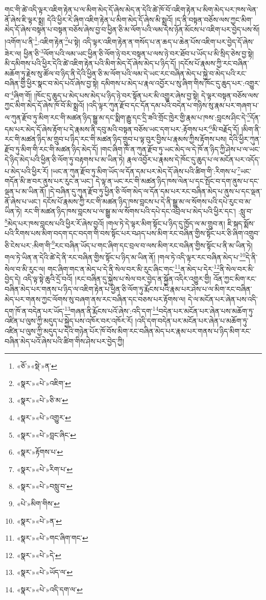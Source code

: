 གང་གི་ཚེ་འདི་ལྟར་འཇིག་རྟེན་པ་ལ་མིག་མེད་དོ་ཞེས་མེད་ན་དེའི་ཚེ་ཁོ་བོ་འཇིག་རྟེན་པ་མིག་མེད་པར་ཁས་ལེན་ནོ་ཞེས་ཇི་ལྟར་སྨྲ། དེའི་ཕྱིར་རེ་ཞིག་འཇིག་རྟེན་པ་མིག་མེད་དོ་ཞེས་མི་སྨྲའོ། །ད་ནི་བསྟན་བཅོས་ལས་ཀྱང་མིག་མེད་དོ་ཞེས་བསྟན་པ་བསྟན་བཅོས་ཞེས་བྱ་བ་ཕྱིན་ཅི་མ་ལོག་པའི་ལམ་དེས་ཉོན་མོངས་པ་འཇིག་པར་བྱེད་པས་སོ། །འགོག་པ་ནི་\footnote{«ཅོ་»«སྡེ་»ན་}:འཇིག་རྟེན་\footnote{«སྣར་»«པེ་»འཇིག་}པ་སྟེ། འདི་ལྟར་འཇིག་རྟེན་ན་གསོད་པ་ན་ཆད་པ་ཆེན་པོས་འཇིག་པར་བྱེད་དོ་ཞེས་ཟེར་ལ། ཕྱིན་ཅི་\footnote{«སྣར་»«པེ་»ཅི་མ་}ལོག་པའི་ལམ་ཡང་ཕྱིན་ཅི་ལོག་ཉེ་བར་བསྟན་པ་ལས་ཉེ་བར་ཐོབ་པ་ཡོད་པ་མི་སྲིད་ཅེས་བྱ་སྟེ། མི་དམིགས་པའི་ཕྱིར་དེའི་ཚེ་འཇིག་རྟེན་པའི་མིག་མེད་དོ་ཞེས་མེད་པ་ཉིད་དོ། །དངོས་པོ་རྣམས་ཀྱི་རང་བཞིན་མཆོག་ཏུ་རྗེས་སུ་ཚོལ་བ་ཉིད་ནི་དེའི་ཕྱིན་ཅི་མ་ལོག་པའི་ལམ་དེ་ཡང་རང་བཞིན་མེད་པ་སྐྱེ་བ་མེད་པའི་རང་བཞིན་གྱི་ཕྱིར་སྣང་བ་མེད་པའོ་ཞེས་བྱ་སྟེ། དམིགས་པ་མེད་པ་རྣལ་འབྱོར་པ་སུ་ཞིག་གིས་ཁོང་དུ་ཆུད་པར་:འགྱུར་བ་\footnote{«སྣར་»«པེ་»འགྱུར་}ཞིག་གོ། །ཁོང་དུ་ཆུད་པ་མེད་པས་མེད་པ་ཉིད་ཉེ་བར་སྟོན་པར་མི་འགྱུར་ཞེས་བྱ་སྟེ། དེ་ལྟར་བསྟན་བཅོས་ལས་ཀྱང་མིག་མེད་དོ་ཞེས་ཁོ་བོ་མི་སྨྲའོ། །འདི་ལྟར་ཀུན་རྫོབ་དང་དོན་དམ་པའི་བདེན་པ་གཉིས་སུ་རྣམ་པར་གཞག་པ་ལ་ཀུན་རྫོབ་ཏུ་མིག་རང་གི་མཚན་ཉིད་སྒྱུ་མ་དང་སྨིག་རྒྱུ་དང་དྲི་ཟའི་གྲོང་ཁྱེར་གྱི་རྣམ་པ་ཁས་:བླངས་ཤིང་དེ་\footnote{«སྣར་»«པེ་»བླང་ཞིང་}དོན་དམ་པར་མེད་དོ་ཞེས་རྟོག་པ་དེ་རྣམས་ནི་དབུ་མའི་བསྟན་བཅོས་ཡང་དག་པར་:རྟོགས་པར་\footnote{«སྣར་»རྟོགས་པ་}མི་བརྗོད་དོ། །མིག་ནི་རང་གི་མཚན་ཉིད་མ་གྲུབ་པ་ཉིད་རང་གི་མཚན་ཉིད་གྲུབ་པ་ལྟ་བུར་བྱིས་པ་རྣམས་ཀྱིས་རྟོགས་པས། དེའི་ཕྱིར་ཀུན་རྫོབ་ཏུ་མིག་གི་རང་གི་མཚན་ཉིད་མེད་དོ། །གང་ཞིག་ཁོ་ན་ཀུན་རྫོབ་ཏུ་ཡང་མེད་ལ་དེ་ཁོ་ན་ཉིད་ཀྱི་ཤེས་པ་ལ་ཡང་དེ་ཉིད་མེད་པའི་ཕྱིན་ཅི་ལོག་ཏུ་བརྟགས་པ་མ་ཡིན་ཏེ། རྣལ་འབྱོར་པ་རྣམས་དེ་ཁོང་དུ་ཆུད་པ་ལ་མངོན་པར་འདོད་པ་མེད་པའི་ཕྱིར་རོ། །ཡང་ན་ཀུན་རྫོབ་ཏུ་མིག་ཡོད་ལ་དོན་དམ་པར་མེད་དོ་ཞེས་པའི་ཚིག་གི་:རིགས་པ་\footnote{«སྣར་»«པེ་»རིག་པ་}ཡང་གདོན་མི་ཟ་བར་ནུས་པར་རུང་ན་ཡང་། དེ་ལྟ་ན་ཡང་རང་གི་མཚན་ཉིད་ཁས་ལེན་པ་དང་སྤོང་བ་དག་ནུས་པ་དང་ལྡན་པ་མ་ཡིན་ནོ། །དེ་བཞིན་དུ་ཀུན་རྫོབ་ཏུ་ཕྱིན་ཅི་ལོག་མེད་ལ་དོན་དམ་པར་རང་བཞིན་མེད་པ་ནུས་པ་དང་ལྡན་ནོ་ཞེས་པ་ཡང་། དངོས་པོ་རྣམས་ཀྱི་རང་གི་མཚན་ཉིད་ཁས་བླངས་པ་དེ་ནི་སྒྱུ་མ་ལ་སོགས་པའི་དཔེ་རུང་བ་མ་ཡིན་ཏེ། རང་གི་མཚན་ཉིད་ཁས་བླངས་པ་ལ་སྒྱུ་མ་ལ་སོགས་པའི་དཔེ་དང་འབྲེལ་པ་མེད་པའི་ཕྱིར་དང་། :སླུ་བ་\footnote{«སྣར་»«པེ་»བསླུ་བ་}མེད་པར་ཁས་བླངས་པའི་ཕྱིར་རོ་ཞེས་བྱའོ། །གལ་ཏེ་དེ་ལྟར་མིག་སྟོང་པ་ཉིད་དུ་ཁྱོད་ལ་མ་གྲུབ་ན། ཇི་སྐད་སྨོས་པའི་རིགས་པས་མིག་བདག་དང་བདག་གི་བས་སྟོང་པར་བཤད་པས་མིག་རང་བཞིན་གྱིས་སྟོང་པར་ཅི་ཞིག་འགྲུབ་ཅི་ངེས་པར་:མིག་གི་\footnote{«པེ་»མིག་གིས་}རང་བཞིན་ཡོད་པ་གང་ཞིག་དང་བྲལ་བ་ལས་མིག་རང་བཞིན་གྱིས་སྟོང་པ་ནི་མ་ཡིན་ཏེ། གལ་ཏེ་ཡིན་ན་དེའི་ཚེ་དེ་ནི་རང་བཞིན་གྱིས་སྟོང་པ་ཉིད་མ་ཡིན་ནོ། །གལ་ཏེ་འདི་ལྟར་རང་བཞིན་མེད་པ་\footnote{«སྣར་»«པེ་»ན་}དེ་ནི་སེལ་བ་མི་རུང་ལ། གང་ཞིག་གང་ན་མེད་པ་དེ་ནི་སེལ་བར་མི་རུང་ཞིང་གང་\footnote{«སྣར་»«པེ་»གང་ཞིག་གང་}ན་མེད་པ་དེར་\footnote{«སྣར་»«པེ་»དེ་}ནི་སེལ་བར་མི་བྱེད་དེ། འདི་ལྟ་སྟེ་ཆུའི་དྲོ་བའོ། །རང་བཞིན་དུ་སྐྱེས་པ་སེལ་བར་བྱེད་ན་སྐྱོན་འདིར་འགྱུར་གྱི། འོན་ཀྱང་མིག་རང་བཞིན་མེད་པར་གནས་པ་ཉིད་ལ་འཇིག་རྟེན་པ་ཕྱིན་ཅི་ལོག་ཏུ་རྨོངས་པའི་རྣམ་པར་ཤེས་པ་ལ་མིག་རང་བཞིན་མེད་པར་གནས་ཀྱང་ལོགས་སུ་བཞག་ནས་རང་བཞིན་དང་བཅས་པར་རྟོགས་ལ། དེ་ལ་མངོན་པར་ཞེན་པས་འདི་དག་ཁོ་ན་བདེན་པར་ཡོད་\footnote{«སྣར་»«པེ་»ཡོད་ལ་}གཞན་ནི་རྨོངས་པའོ་ཞེས་:འདི་དག་\footnote{«སྣར་»«པེ་»འདི་དག་ལ་}བདེན་པར་མངོན་པར་ཞེན་པས་མཆོག་ཏུ་འཛིན་པ་ལུས་ཀྱི་མདུད་པ་སྐྱེད་པས་འཁོར་བར་འཁོར་རོ། །འདི་དག་བདེན་པར་མངོན་པར་ཞེན་པ་མཆོག་ཏུ་འཛིན་པ་ལུས་ཀྱི་མདུད་པ་དེའི་གཉེན་པོར་ཁོ་བོས་མིག་རང་བཞིན་མེད་པར་རྣམ་པར་གནས་པ་ཉིད་མིག་རང་བཞིན་མེད་པའོ་ཞེས་པའི་ཚིག་གིས་ཤེས་པར་བྱེད་ཀྱི། 
